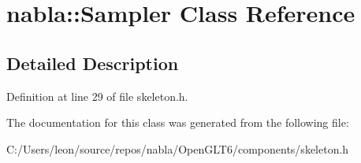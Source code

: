 \hypertarget{classnabla_1_1_sampler}{}\section{nabla\+::Sampler Class Reference}
\label{classnabla_1_1_sampler}


\subsection{Detailed Description}


Definition at line 29 of file skeleton.\+h.



The documentation for this class was generated from the following file\+:\begin{DoxyCompactItemize}
\item 
C\+:/\+Users/leon/source/repos/nabla/\+Open\+G\+L\+T6/components/skeleton.\+h\end{DoxyCompactItemize}
